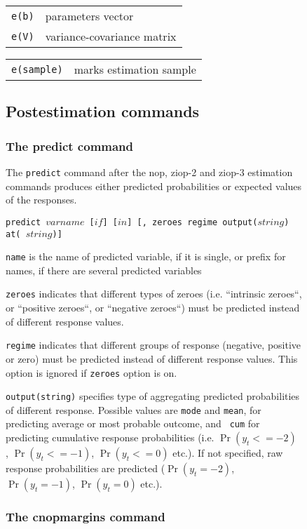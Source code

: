 \documentclass[letterpaper,fleqn,12pt]{article}
\begin{document}
\begin{figure}[H]
\begin{onehalfspace}

\begin{tabular}{p{3cm}p{12cm}}
\texttt{e(b)} & parameters vector \\ 
\texttt{e(V)} & variance-covariance matrix%
\end{tabular}


\begin{tabular}{p{3cm}p{12cm}}
\texttt{e(sample)} & marks estimation sample%
\end{tabular}

\subsection{Postestimation commands}

\subsubsection*{The predict command}

The \texttt{predict} command after the nop, ziop-2 and ziop-3 estimation
commands produces either predicted probabilities or expected values of the
responses.

\texttt{predict $varname$ [$if$] [$in$] [, zeroes regime output($string$) at(%
$string$)]}

\texttt{name} is the name of predicted variable, if it is single, or prefix
for names, if there are several predicted variables

\texttt{zeroes} indicates that different types of zeroes (i.e. ``intrinsic
zeroes``, or ``positive zeroes``, or ``negative zeroes``) must be predicted
instead of different response values.

\texttt{regime} indicates that different groups of response (negative,
positive or zero) must be predicted instead of different response values.
This option is ignored if \texttt{zeroes} option is on.

\texttt{output(string)} specifies type of aggregating predicted
probabilities of different response. Possible values are \texttt{mode} and 
\texttt{mean}, for predicting average or most probable outcome, and \texttt{%
cum} for predicting cumulative response probabilities (i.e. $\Pr (y_{t}<=-2)$%
, $\Pr (y_{t}<=-1)$, $\Pr (y_{t}<=0)$ etc.). If not specified, raw response
probabilities are predicted ($\Pr (y_{t}=-2)$, $\Pr (y_{t}=-1)$, $\Pr
(y_{t}=0)$ etc.).

\subsubsection*{The cnopmargins command}


\end{onehalfspace}
\end{figure}
\end{document}
